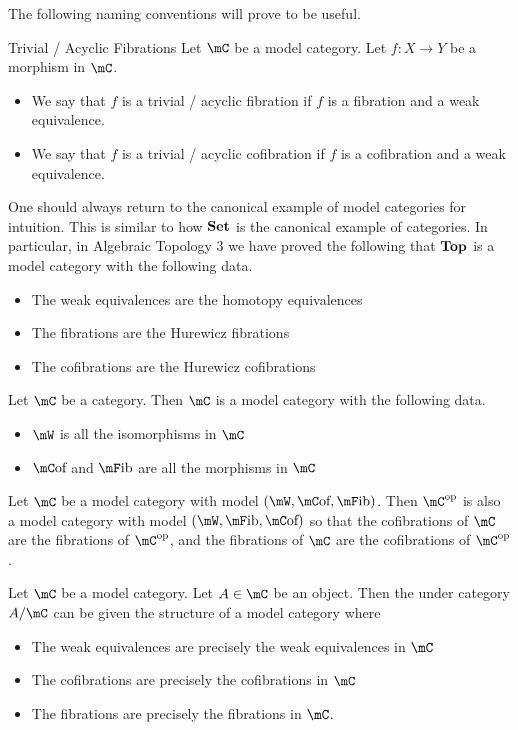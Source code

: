 \documentclass[a4paper]{article}
\begin{document}
The following naming conventions will prove to be useful. 

\begin{defn}{Trivial / Acyclic Fibrations}{} Let $\mC$ be a model category. Let $f:X\to Y$ be a morphism in $\mC$. 
\begin{itemize}
\item We say that $f$ is a trivial / acyclic fibration if $f$ is a fibration and a weak equivalence. 
\item We say that $f$ is a trivial / acyclic cofibration if $f$ is a cofibration and a weak equivalence. 
\end{itemize}
\end{defn}

One should always return to the canonical example of model categories for intuition. This is similar to how $\bold{Set}$ is the canonical example of categories. In particular, in Algebraic Topology 3 we have proved the following that $\bold{Top}$ is a model category with the following data. 

\begin{itemize}
\item The weak equivalences are the homotopy equivalences
\item The fibrations are the Hurewicz fibrations
\item The cofibrations are the Hurewicz cofibrations
\end{itemize}

\begin{lmm}{}{} Let $\mC$ be a category. Then $\mC$ is a model category with the following data. 
\begin{itemize}
\item $\mW$ is all the isomorphisms in $\mC$
\item $\mC\text{of}$ and $\mF\text{ib}$ are all the morphisms in $\mC$
\end{itemize}
\end{lmm}

\begin{prp}{}{} Let $\mC$ be a model category with model $(\mW,\mC\text{of},\mF\text{ib})$. Then $\mC^\text{op}$ is also a model category with model $(\mW, \mF\text{ib},\mC\text{of})$ so that the cofibrations of $\mC$ are the fibrations of $\mC^\text{op}$, and the fibrations of $\mC$ are the cofibrations of $\mC^\text{op}$. 
\end{prp}

\begin{prp}{}{} Let $\mC$ be a model category. Let $A\in\mC$ be an object. Then the under category $A/\mC$ can be given the structure of a model category where 
\begin{itemize}
\item The weak equivalences are precisely the weak equivalences in $\mC$
\item The cofibrations are precisely the cofibrations in $\mC$
\item The fibrations are precisely the fibrations in $\mC$. 
\end{itemize}
\end{prp}
\end{document}
